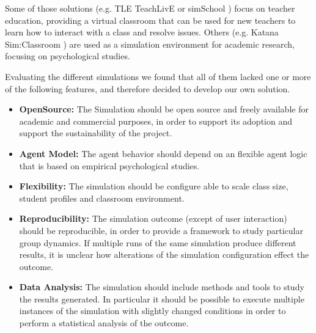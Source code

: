 \bb

Some of those solutions (e.g. TLE TeachLivE\cite{Dieker2014}\cite{Dieker2017} or
simSchool \cite{Badiee2015}) focus on teacher education, providing a virtual classroom
that can be used for new teachers to learn how to interact with a class and resolve issues.
Others (e.g. Katana Sim:Classroom \cite{Blume2019}) are used as a simulation
environment for academic research, focusing on psychological studies.

\bb

Evaluating the different simulations we found that all of them lacked one or more
of the following features, and therefore decided to develop our own solution.

\begin{itemize}
    \item \textbf{OpenSource:} The Simulation should be open source and freely available
    for academic and commercial purposes, in order to support its adoption and support
    the sustainability of the project.
    \item \textbf{Agent Model:} The agent behavior should depend on an
    flexible agent logic that is based on empirical psychological studies.
    \item \textbf{Flexibility:} The simulation should be configure able to scale
    class size, student profiles and classroom environment.
    \item \textbf{Reproducibility:} The simulation outcome (except of user interaction) should
    be reproducible, in order to provide a framework to study particular group dynamics.
    If multiple runs of the same simulation produce different results, it is unclear
    how alterations of the simulation configuration effect the outcome.
    \item \textbf{Data Analysis:} The simulation should include methods and tools
    to study the results generated. In particular it should be possible to execute multiple
    instances of the simulation with slightly changed conditions in order to
    perform a statistical analysis of the outcome.
\end{itemize}
